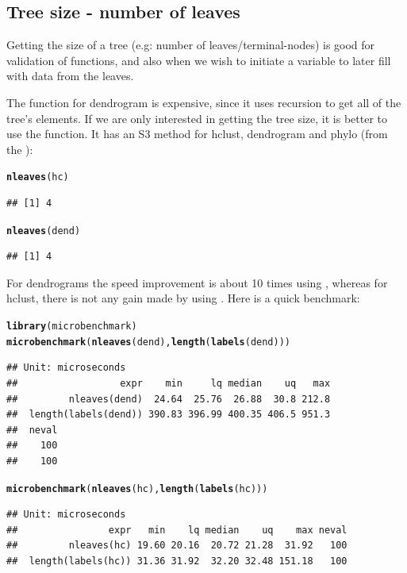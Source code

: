 \documentclass[shortnames,nojss,article]{jss}\usepackage[]{graphicx}\usepackage[]{color}
\makeatletter
\newcommand{\hlstd}[1]{\textcolor[rgb]{0.345,0.345,0.345}{#1}}%
\newcommand{\hlkwd}[1]{\textcolor[rgb]{0.737,0.353,0.396}{\textbf{#1}}}%
\newenvironment{kframe}{%
 \def\at@end@of@kframe{}%
 \ifinner\ifhmode%
  \def\at@end@of@kframe{\end{minipage}}%
  \begin{minipage}{\columnwidth}%
 \fi\fi%
 \def\FrameCommand##1{\hskip\@totalleftmargin \hskip-\fboxsep
 \colorbox{shadecolor}{##1}\hskip-\fboxsep
     \hskip-\linewidth \hskip-\@totalleftmargin \hskip\columnwidth}%
 \MakeFramed {\advance\hsize-\width
   \@totalleftmargin\z@ \linewidth\hsize
   \@setminipage}}%
 {\par\unskip\endMakeFramed%
 \at@end@of@kframe}
\newenvironment{knitrout}{}{} %
\makeatother
\begin{document}
\subsection{Tree size - number of leaves}

Getting the size of a tree (e.g: number of leaves/terminal-nodes) is good for validation of functions, and also when we wish to initiate a variable to later fill with data from the leaves. 

The  function for dendrogram is expensive, since it uses recursion to get all of the tree's elements. If we are only interested in getting the tree size, it is better to use the  function. It has an S3 method for hclust, dendrogram and phylo (from the ):

\begin{knitrout}
\color{fgcolor}\begin{kframe}
\begin{alltt}
\hlkwd{nleaves}\hlstd{(hc)}
\end{alltt}
\begin{verbatim}
## [1] 4
\end{verbatim}
\begin{alltt}
\hlkwd{nleaves}\hlstd{(dend)}
\end{alltt}
\begin{verbatim}
## [1] 4
\end{verbatim}
\end{kframe}
\end{knitrout}


For dendrograms the speed improvement is about 10 times using , whereas for hclust, there is not any gain made by using . Here is a quick benchmark:

\begin{knitrout}
\color{fgcolor}\begin{kframe}
\begin{alltt}
\hlkwd{library}\hlstd{(microbenchmark)}
\hlkwd{microbenchmark}\hlstd{(}\hlkwd{nleaves}\hlstd{(dend),} \hlkwd{length}\hlstd{(}\hlkwd{labels}\hlstd{(dend)))}
\end{alltt}
\begin{verbatim}
## Unit: microseconds
##                  expr    min     lq median    uq   max
##         nleaves(dend)  24.64  25.76  26.88  30.8 212.8
##  length(labels(dend)) 390.83 396.99 400.35 406.5 951.3
##  neval
##    100
##    100
\end{verbatim}
\begin{alltt}
\hlkwd{microbenchmark}\hlstd{(}\hlkwd{nleaves}\hlstd{(hc),} \hlkwd{length}\hlstd{(}\hlkwd{labels}\hlstd{(hc)))}
\end{alltt}
\begin{verbatim}
## Unit: microseconds
##                expr   min    lq median    uq    max neval
##         nleaves(hc) 19.60 20.16  20.72 21.28  31.92   100
##  length(labels(hc)) 31.36 31.92  32.20 32.48 151.18   100
\end{verbatim}
\end{kframe}
\end{knitrout}
\end{document}
